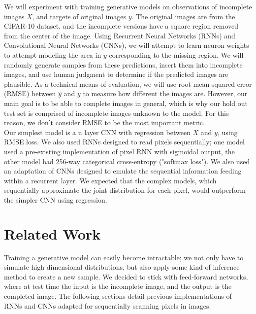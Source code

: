 \documentclass[10pt,twocolumn,letterpaper]{article}
\begin{document}
\par 
We will experiment with training generative models on observations of incomplete images $X$, and targets of original images $y$. The original images are from the CIFAR-10 dataset, and the incomplete versions have a square region removed from the center of the image. Using Recurrent Neural Networks (RNNs) and Convolutional Neural Networks (CNNs), we will attempt to learn neuron weights to attempt modeling the area in $y$ corresponding to the missing region. We will randomly generate samples from these predictions, insert them into incomplete images, and use human judgment to determine if the predicted images are plausible. As a technical means of evaluation, we will use root mean squared error (RMSE) between $\hat y$ and $y$ to measure how different the images are. However, our main goal is to be able to complete images in general, which is why our hold out test set is comprised of incomplete images unknown to the model. For this reason, we don't consider RMSE to be the most important metric.\\

Our simplest model is a n layer CNN with regression between $X$ and $y$, using RMSE loss. We also used RNNs designed to read pixels sequentially; one model used a pre-existing implementation of pixel RNN with sigmoidal output, the other model had 256-way categorical cross-entropy ("softmax loss"). We also used an adaptation of CNNs designed to emulate the sequential information feeding within a recurrent layer. We expected that the complex models, which sequentially approximate the joint distribution for each pixel, would outperform the simpler CNN using regression.\\

\section{Related Work} 
Training a generative model can easily become intractable; we not only have to simulate high dimensional distributions, but also apply some kind of inference method to create a new sample. We decided to stick with feed-forward networks, where at test time the input is the incomplete image, and the output is the completed image. The following sections detail previous implementations of RNNs and CNNs adapted for sequentially scanning pixels in images.
\end{document}
